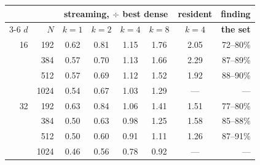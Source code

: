 \begin{tabular}{rrcccccr}
\toprule
& & \multicolumn{4}{c}{\textbf{streaming}, $\div$ best dense} & \textbf{resident} & \textbf{finding} \\
\cmidrule(lr){3-6}
$d$ & $N$ & $k{=}1$ & $k{=}2$ & $k{=}4$ & $k{=}8$ & $k{=}4$ & \textbf{the set} \\
\midrule
16 & 192 & 0.62 & 0.81 & 1.15 & 1.76 & 2.05 & 72--80\% \\
 & 384 & 0.57 & 0.70 & 1.13 & 1.66 & 2.29 & 87--89\% \\
 & 512 & 0.57 & 0.69 & 1.12 & 1.52 & 1.92 & 88--90\% \\
 & 1024 & 0.54 & 0.67 & 1.03 & 1.29 & --- & --- \\
\midrule
32 & 192 & 0.63 & 0.84 & 1.06 & 1.41 & 1.51 & 77--80\% \\
 & 384 & 0.50 & 0.63 & 0.98 & 1.25 & 1.58 & 85--88\% \\
 & 512 & 0.50 & 0.60 & 0.91 & 1.11 & 1.26 & 87--91\% \\
 & 1024 & 0.46 & 0.56 & 0.78 & 0.92 & --- & --- \\
\bottomrule
\end{tabular}%
